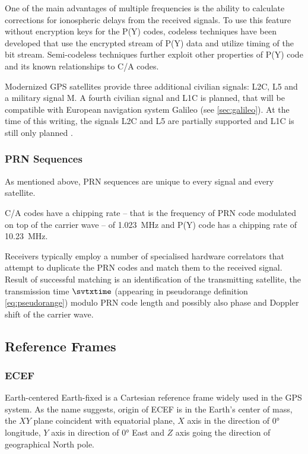 One of the main advantages of multiple frequencies is the ability to calculate corrections for ionospheric delays from the received signals.
To use this feature without encryption keys for the P(Y) codes, codeless techniques have been developed
that use the encrypted stream of P(Y) data and utilize timing of the bit stream.
Semi-codeless techniques further exploit other properties of P(Y) code and its known relationships to C/A codes.

Modernized GPS satellites provide three additional civilian signals:
L2C, L5 and a military signal M. A fourth civilian signal and L1C is planned, that will be compatible with
European navigation system Galileo (see \ref{sec:galileo}).
At the time of this writing, the signals L2C and L5 are partially supported and L1C is still only
planned \cite{gps-modernization-www}.

\subsubsection{PRN Sequences}
As mentioned above, PRN sequences are unique to every signal and every satellite.

C/A codes have a chipping rate -- that is the frequency of PRN code modulated on top
of the carrier wave -- of \SI{1.023}{\mega\hertz} and P(Y) code has a chipping rate
of \SI{10.23}{\mega\hertz}.

Receivers typically employ a number of specialised hardware correlators
that attempt to duplicate the PRN codes and match them to the received signal.
Result of successful matching is an identification of the transmitting satellite,
the transmission time \(\svtxtime\) (appearing in pseudorange definition \eqref{eq:pseudorange})
modulo PRN code length and possibly also phase and Doppler shift of the carrier wave.

\subsection{Reference Frames}

\subsubsection{ECEF}
Earth-centered Earth-fixed is a Cartesian reference frame widely used in the GPS system.
As the name suggests, origin of ECEF is in the Earth's center of mass, the \(XY\) plane coincident
with equatorial plane, \(X\) axis in the direction of
\ang{0} longitude, \(Y\) axis in direction of \ang{0} East and \(Z\) axis going
the direction of geographical North pole.

